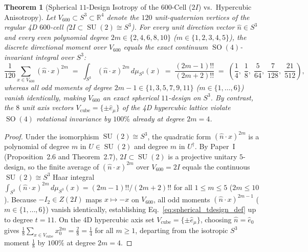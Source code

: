 \documentclass[11pt,a4paper]{article}
\newtheorem{theorem}{Theorem}[section]
\theoremstyle{definition}
\theoremstyle{remark}
\newcommand{\R}{\mathbb{R}}
\newcommand{\SU}{\operatorname{SU}}
\newcommand{\SO}{\operatorname{SO}}
\begin{document}
\begin{theorem}[Spherical $11$-Design Isotropy of the $600$-Cell ($2I$) vs.\ Hypercubic Anisotropy]
\label{thm:spherical_design}
Let $V_{600} \subset S^3 \subset \R^4$ denote the $120$ unit-quaternion vertices of the regular 4D $600$-cell ($2I \subset \SU(2) \cong S^3$). For every unit direction vector $\hat{n} \in S^3$ and every even polynomial degree $2m \in \{2, 4, 6, 8, 10\}$ ($m \in \{1, 2, 3, 4, 5\}$), the discrete directional moment over $V_{600}$ equals the exact continuum $\SO(4)$-invariant integral over $S^3$:
\begin{equation}
\label{eq:spherical_design_moments}
\frac{1}{120} \sum_{x \in V_{600}} (\hat{n} \cdot x)^{2m} \;=\; \int_{S^3} (\hat{n} \cdot x)^{2m}\,d\mu_{S^3}(x) \;=\; \frac{(2m - 1)!!}{(2m + 2)!!} \;=\; \left(\frac{1}{4},\; \frac{1}{8},\; \frac{5}{64},\; \frac{7}{128},\; \frac{21}{512}\right),
\end{equation}
whereas all odd moments of degree $2m - 1 \in \{1, 3, 5, 7, 9, 11\}$ ($m \in \{1, \dots, 6\}$) vanish identically, making $V_{600}$ an exact \emph{spherical $11$-design} on $S^3$. By contrast, the $8$ unit axis vectors $V_{\mathrm{cube}} = \{\pm \hat{e}_\mu\}$ of the 4D hypercubic lattice violate $\SO(4)$ rotational invariance by $100\%$ already at degree $2m = 4$.
\end{theorem}

\begin{proof}
Under the isomorphism $\SU(2) \cong S^3$, the quadratic form $(\hat{n}\cdot x)^{2m}$ is a polynomial of degree $m$ in $U \in \SU(2)$ and degree $m$ in $U^\dagger$. By Paper~I (Proposition~2.6 and Theorem~2.7), $2I \subset \SU(2)$ is a projective unitary $5$-design, so the finite average of $(\hat{n}\cdot x)^{2m}$ over $V_{600} = 2I$ equals the continuous $\SU(2) \cong S^3$ Haar integral $\int_{S^3} (\hat{n}\cdot x)^{2m}\,d\mu_{S^3}(x) = (2m-1)!!/(2m+2)!!$ for all $1 \le m \le 5$ ($2m \le 10$). Because $-I_2 \in Z(2I)$ maps $x \mapsto -x$ on $V_{600}$, all odd moments $(\hat{n}\cdot x)^{2m-1}$ ($m \in \{1, \dots, 6\}$) vanish identically, establishing Eq.~\eqref{eq:spherical_tdesign_def} up to degree $t = 11$. On the 4D hypercubic axis set $V_{\mathrm{cube}} = \{\pm \hat{e}_\mu\}$, choosing $\hat{n} = \hat{e}_0$ gives $\frac{1}{8}\sum_{x \in V_{\mathrm{cube}}} x_0^{2m} = \frac{2}{8} = \frac{1}{4}$ for all $m \ge 1$, departing from the isotropic $S^3$ moment $\frac{1}{8}$ by $100\%$ at degree $2m = 4$.
\end{proof}
\end{document}
